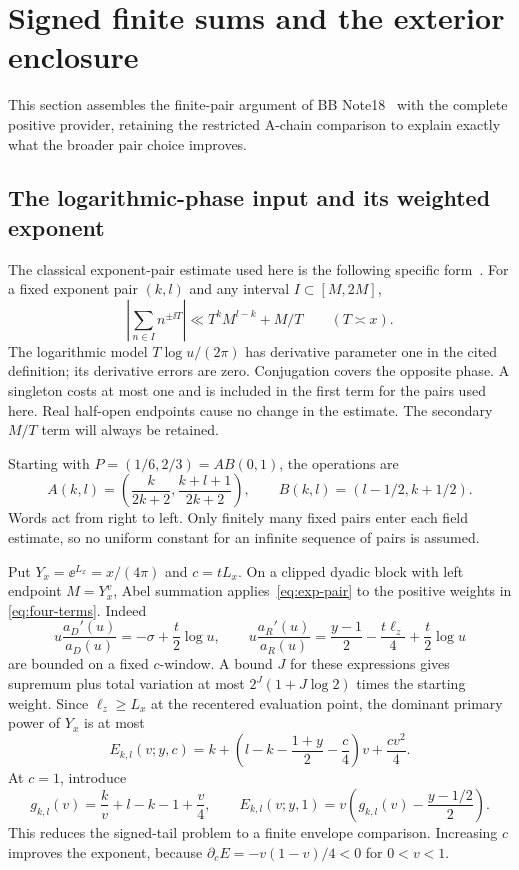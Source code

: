 \section{Signed finite sums and the exterior enclosure}\label{sec:width}

This section assembles the finite-pair argument of BB Note18~\cite{BB18}
with the complete positive provider, retaining the restricted A-chain
comparison to explain exactly what the broader pair choice improves.

\subsection{The logarithmic-phase input and its weighted exponent}

The classical exponent-pair estimate used here is the following
specific form~\cite{MontgomeryVaughan}. For a fixed exponent pair
$(k,l)$ and any interval $I\subset[M,2M]$,
\begin{equation}\label{eq:exp-pair}
 \left|\sum_{n\in I}n^{\pm\ii T}\right|
 \ll T^kM^{l-k}+M/T\qquad(T\asymp x).
\end{equation}
The logarithmic model $T\log u/(2\pi)$ has derivative parameter one
in the cited definition; its derivative errors are zero. Conjugation
covers the opposite phase. A singleton costs at most one and is
included in the first term for the pairs used here. Real half-open
endpoints cause no change in the estimate. The secondary $M/T$ term
will always be retained.

Starting with $P=(1/6,2/3)=AB(0,1)$, the operations are
\[
 A(k,l)=\left(\frac{k}{2k+2},\frac{k+l+1}{2k+2}\right),\qquad
 B(k,l)=(l-1/2,k+1/2).
\]
Words act from right to left. Only finitely many fixed pairs enter
each field estimate, so no uniform constant for an infinite sequence
of pairs is assumed.

Put $Y_x=\ee^{L_x}=x/(4\pi)$ and $c=tL_x$.
On a clipped dyadic block with left endpoint $M=Y_x^v$, Abel summation
applies~\eqref{eq:exp-pair} to the positive weights in
\eqref{eq:four-terms}. Indeed
\[
 u\frac{a_D'(u)}{a_D(u)}=-\sigma+\frac t2\log u,\qquad
 u\frac{a_R'(u)}{a_R(u)}=\frac{y-1}{2}-\frac{t\ell_z}{4}
                                      +\frac t2\log u
\]
are bounded on a fixed $c$-window. A bound $J$ for these expressions
gives supremum plus total variation at most
$2^J(1+J\log2)$ times the starting weight.
Since $\ell_z\ge L_x$ at the recentered evaluation point, the dominant
primary power of $Y_x$ is at most
\begin{equation}\label{eq:dominant-power}
 E_{k,l}(v;y,c)
 =k+\left(l-k-\frac{1+y}{2}-\frac c4\right)v+\frac{cv^2}{4}.
\end{equation}
At $c=1$, introduce
\begin{equation}\label{eq:envelope-function}
 g_{k,l}(v)=\frac{k}{v}+l-k-1+\frac v4,
 \qquad E_{k,l}(v;y,1)=v\left(g_{k,l}(v)-\frac{y-1/2}{2}\right).
\end{equation}
This reduces the signed-tail problem to a finite envelope comparison.
Increasing $c$ improves the exponent, because
$\partial_cE=-v(1-v)/4<0$ for $0<v<1$.

